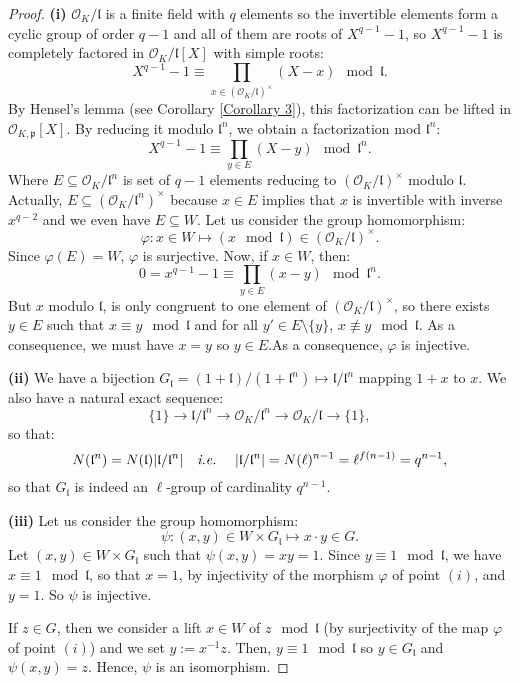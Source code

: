 \documentclass[a4paper,10pt,notitlepage]{report}
\theoremstyle{definition}
\theoremstyle{plain}
\theoremstyle{definition}
\newcommand{\ie}{\emph{i.e.}\ }
\newcommand{\mO}{\mathcal{O}}
\renewcommand{\(}{\left(}
\renewcommand{\)}{\right)}
\newcommand{\mf}[1]{\mathfrak{#1}}
\begin{document}
\begin{proof}
\textbf{(i)} $\mO_K/\mf{l}$ is a finite field with $q$ elements so the invertible elements form a cyclic group of order $q-1$ and all of them are roots of $X^{q-1}-1$, so $X^{q-1}-1$ is completely factored in $\mO_K/\mf{l}[X]$ with simple roots:
\[X^{q-1}-1\equiv \prod_{x\in(\mO_K/\mf{l})^\times}(X-x) \mod \mf{l}.\]
By Hensel's lemma (see Corollary \ref{Corollary 3}), this factorization can be lifted in $\mO_{K,\mf{p}}[X]$. By reducing it modulo $\mf{l}^n$, we obtain a factorization mod $\mf{l}^n$:
\[X^{q-1}-1\equiv \prod_{y\in E}(X-y) \mod \mf{l}^n.\] 
Where $E\subseteq \mO_K/\mf{l}^n$ is set of $q-1$ elements reducing to $(\mO_K/\mf{l})^\times$ modulo $\mf{l}$. Actually, $E\subseteq (\mO_K/\mf{l}^n)^\times$ because $x\in E$ implies that $x$ is invertible with inverse $x^{q-2}$ and we even have $E\subseteq W$. Let us consider the group homomorphism:
\[\varphi: x\in W\longmapsto (x \mod \mf{l})\in(\mO_K/\mf{l})^\times.\]
Since $\varphi(E)=W$, $\varphi$ is surjective.  Now, if $x\in W$, then:
\[0=x^{q-1}-1\equiv \prod_{y\in E}(x-y) \mod \mf{l}^n.\]
But $x$ modulo $\mf{l}$, is only congruent to one element of $(\mO_K/\mf{l})^\times$, so there exists $y\in E$ such that $x\equiv y \mod \mf{l}$ and for all $y'\in E\setminus\{y\}$,  $x\not\equiv y \mod \mf{l}$. As a consequence, we must have $x=y$ so $y\in E$.As a consequence, $\varphi$ is injective.

\textbf{(ii)} We have a bijection $G_{\mf{l}}=(1+\mf{l})/(1+\mf{l}^n)\longmapsto \mf{l}/\mf{l}^n$ mapping $1+x$ to $x$. We also have a natural exact sequence:
\[\{1\}\longrightarrow \mf{l}/\mf{l}^n\longrightarrow \mO_K/\mf{l}^n\longrightarrow\mO_K/\mf{l}\longrightarrow\{1\},\]
so that:
\[N(\mf{l}^n)=N(\mf{l})|\mf{l}/\mf{l}^n| \quad \mbox{\ie} \quad |\mf{l}/\mf{l}^n|=N(\ell)^{n-1}=\ell^{f(n-1)}=q^{n-1},\]
so that $G_{\mf{l}}$ is indeed an $\ell$-group of cardinality $q^{n-1}$.

\textbf{(iii)} Let us consider the group homomorphism:
\[\psi: (x,y)\in W\times G_{\mf{l}}\longmapsto x\cdot y\in G.\]
Let $(x,y)\in W\times G_{\mf{l}}$ such that $\psi(x,y)=xy=1$. Since $y\equiv 1 \mod \mf{l}$, we have $x\equiv 1 \mod \mf{l}$, so that $x=1$, by injectivity of the morphism $\varphi$ of point $(i)$, and $y=1$. So $\psi$ is injective. 

If $z\in G$, then we consider a lift $x\in W$ of $z \mod \mf{l}$ (by surjectivity of the map $\varphi$ of point $(i)$) and we set $y:=x^{-1}z$. Then, $y\equiv 1 \mod \mf{l}$ so $y\in G_{\mf{l}}$ and $\psi(x,y)=z$. Hence, $\psi$ is an isomorphism.
 
\end{proof}
\end{document}
